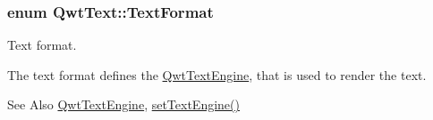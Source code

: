 \hypertarget{class_qwt_text_a63e0d6a59a427a37ed0bfa71b782fd76}{
\subsubsection[{Text\-Format}]{\setlength{\rightskip}{0pt plus 5cm}enum {\bf Qwt\-Text\-::\-Text\-Format}}}\label{class_qwt_text_a63e0d6a59a427a37ed0bfa71b782fd76}


Text format. 

The text format defines the \hyperlink{class_qwt_text_engine}{Qwt\-Text\-Engine}, that is used to render the text.

\begin{DoxySeeAlso}{See Also}
\hyperlink{class_qwt_text_engine}{Qwt\-Text\-Engine}, \hyperlink{class_qwt_text_aef6a1e71b1feba3116ce69f6c9de70ad}{set\-Text\-Engine()} 
\end{DoxySeeAlso}
